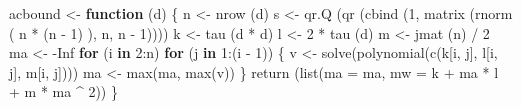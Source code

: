 \documentclass[
  12pt,
]{book}
\newenvironment{Shaded}{\begin{snugshade}}{\end{snugshade}}
\newcommand{\AttributeTok}[1]{\textcolor[rgb]{0.77,0.63,0.00}{#1}}
\newcommand{\ConstantTok}[1]{\textcolor[rgb]{0.00,0.00,0.00}{#1}}
\newcommand{\ControlFlowTok}[1]{\textcolor[rgb]{0.13,0.29,0.53}{\textbf{#1}}}
\newcommand{\DecValTok}[1]{\textcolor[rgb]{0.00,0.00,0.81}{#1}}
\newcommand{\FunctionTok}[1]{\textcolor[rgb]{0.00,0.00,0.00}{#1}}
\newcommand{\NormalTok}[1]{#1}
\newcommand{\OtherTok}[1]{\textcolor[rgb]{0.56,0.35,0.01}{#1}}
\newcommand{\SpecialCharTok}[1]{\textcolor[rgb]{0.00,0.00,0.00}{#1}}
\theoremstyle{definition}
\theoremstyle{definition}
\theoremstyle{definition}
\theoremstyle{definition}
\theoremstyle{remark}
\begin{document}
\begin{Shaded}
\begin{Highlighting}[]
\NormalTok{acbound }\OtherTok{\textless{}{-}} \ControlFlowTok{function}\NormalTok{ (d) \{}
\NormalTok{  n }\OtherTok{\textless{}{-}} \FunctionTok{nrow}\NormalTok{ (d)}
\NormalTok{  s }\OtherTok{\textless{}{-}} \FunctionTok{qr.Q}\NormalTok{ (}\FunctionTok{qr}\NormalTok{ (}\FunctionTok{cbind}\NormalTok{ (}\DecValTok{1}\NormalTok{, }\FunctionTok{matrix}\NormalTok{ (}\FunctionTok{rnorm}\NormalTok{ (}
\NormalTok{    n }\SpecialCharTok{*}\NormalTok{ (n }\SpecialCharTok{{-}} \DecValTok{1}\NormalTok{)}
\NormalTok{  ), n, n }\SpecialCharTok{{-}} \DecValTok{1}\NormalTok{))))}
\NormalTok{  k }\OtherTok{\textless{}{-}} \FunctionTok{tau}\NormalTok{ (d }\SpecialCharTok{*}\NormalTok{ d)}
\NormalTok{  l }\OtherTok{\textless{}{-}} \DecValTok{2} \SpecialCharTok{*} \FunctionTok{tau}\NormalTok{ (d)}
\NormalTok{  m }\OtherTok{\textless{}{-}} \FunctionTok{jmat}\NormalTok{ (n) }\SpecialCharTok{/} \DecValTok{2}
\NormalTok{  ma }\OtherTok{\textless{}{-}} \SpecialCharTok{{-}}\ConstantTok{Inf}
  \ControlFlowTok{for}\NormalTok{ (i }\ControlFlowTok{in} \DecValTok{2}\SpecialCharTok{:}\NormalTok{n)}
    \ControlFlowTok{for}\NormalTok{ (j }\ControlFlowTok{in} \DecValTok{1}\SpecialCharTok{:}\NormalTok{(i }\SpecialCharTok{{-}} \DecValTok{1}\NormalTok{)) \{}
\NormalTok{      v }\OtherTok{\textless{}{-}} \FunctionTok{solve}\NormalTok{(}\FunctionTok{polynomial}\NormalTok{(}\FunctionTok{c}\NormalTok{(k[i, j], l[i, j], m[i, j])))}
\NormalTok{      ma }\OtherTok{\textless{}{-}} \FunctionTok{max}\NormalTok{(ma, }\FunctionTok{max}\NormalTok{(v))}
\NormalTok{    \}}
  \FunctionTok{return}\NormalTok{ (}\FunctionTok{list}\NormalTok{(}\AttributeTok{ma =}\NormalTok{ ma, }\AttributeTok{mw =}\NormalTok{ k }\SpecialCharTok{+}\NormalTok{ ma }\SpecialCharTok{*}\NormalTok{ l }\SpecialCharTok{+}\NormalTok{ m }\SpecialCharTok{*}\NormalTok{ ma }\SpecialCharTok{\^{}} \DecValTok{2}\NormalTok{))}
\NormalTok{\}}


\end{Highlighting}
\end{Shaded}
\end{document}
